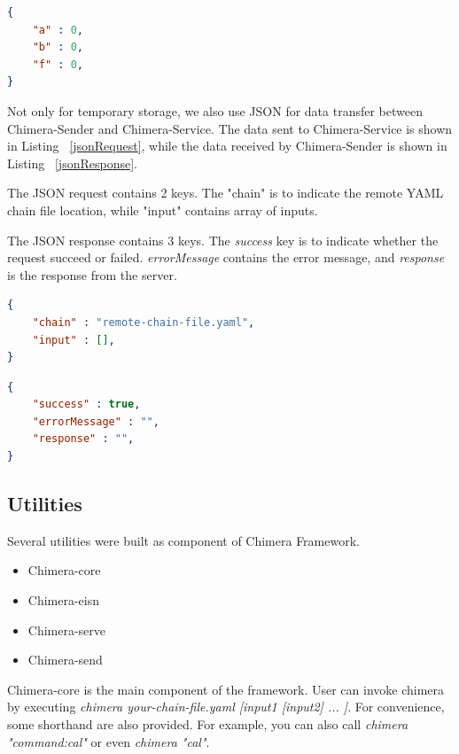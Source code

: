 \documentclass[conference]{IEEEtran}
\begin{document}
\begin{lstlisting}[caption=Initial content of JSON Storage, label=jsonStorageInitial, language=json, basicstyle=\small, breaklines=true]
{
    "a" : 0,
    "b" : 0,
    "f" : 0,
}
\end{lstlisting}

Not only for temporary storage, we also use JSON for data transfer between 
Chimera-Sender and Chimera-Service. The data sent to Chimera-Service is shown in Listing
~\ref{jsonRequest}, while the data received by Chimera-Sender is shown in Listing
~\ref{jsonResponse}.

The JSON request contains 2 keys. The "chain" is to 
indicate the remote YAML chain file location, while "input" contains array of inputs.

The JSON response contains 3 keys. The {\it success} key is to indicate
whether the request succeed or failed. {\it errorMessage} contains the error message, and
{\it response} is the response from the server.

\begin{lstlisting}[caption=JSON Request, label=jsonRequest, language=json, basicstyle=\small, breaklines=true] 
{
    "chain" : "remote-chain-file.yaml",
    "input" : [],
}
\end{lstlisting}

\begin{lstlisting}[caption=JSON Response, label=jsonResponse, language=json, basicstyle=\small, breaklines=true]
{
    "success" : true,
    "errorMessage" : "",
    "response" : "",
}
\end{lstlisting}


\subsection{Utilities}

Several utilities were built as component of Chimera Framework.

\begin{itemize}
    \item Chimera-core
    \item Chimera-eisn
    \item Chimera-serve
    \item Chimera-send
\end{itemize}

Chimera-core is the main component of the framework. User can invoke chimera by
executing {\it chimera your-chain-file.yaml [input1 [input2] ... ]}. For convenience,
some shorthand are also provided. For example, you can also call 
{\it chimera "command:cal"} or even {\it chimera "cal"}.
\end{document}
